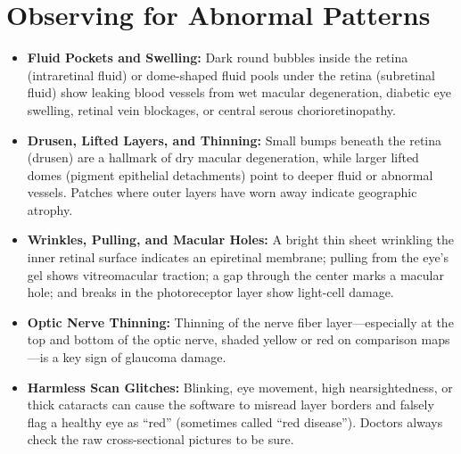 \section{Observing for Abnormal Patterns}
\begin{itemize}
\item \textbf{Fluid Pockets and Swelling:} Dark round bubbles inside the retina (intraretinal fluid) or dome-shaped fluid pools under the retina (subretinal fluid) show leaking blood vessels from wet macular degeneration, diabetic eye swelling, retinal vein blockages, or central serous chorioretinopathy.
\item \textbf{Drusen, Lifted Layers, and Thinning:} Small bumps beneath the retina (drusen) are a hallmark of dry macular degeneration, while larger lifted domes (pigment epithelial detachments) point to deeper fluid or abnormal vessels. Patches where outer layers have worn away indicate geographic atrophy.
\item \textbf{Wrinkles, Pulling, and Macular Holes:} A bright thin sheet wrinkling the inner retinal surface indicates an epiretinal membrane; pulling from the eye's gel shows vitreomacular traction; a gap through the center marks a macular hole; and breaks in the photoreceptor layer show light-cell damage.
\item \textbf{Optic Nerve Thinning:} Thinning of the nerve fiber layer---especially at the top and bottom of the optic nerve, shaded yellow or red on comparison maps---is a key sign of glaucoma damage.
\item \textbf{Harmless Scan Glitches:} Blinking, eye movement, high nearsightedness, or thick cataracts can cause the software to misread layer borders and falsely flag a healthy eye as ``red'' (sometimes called ``red disease''). Doctors always check the raw cross-sectional pictures to be sure.
\end{itemize}


